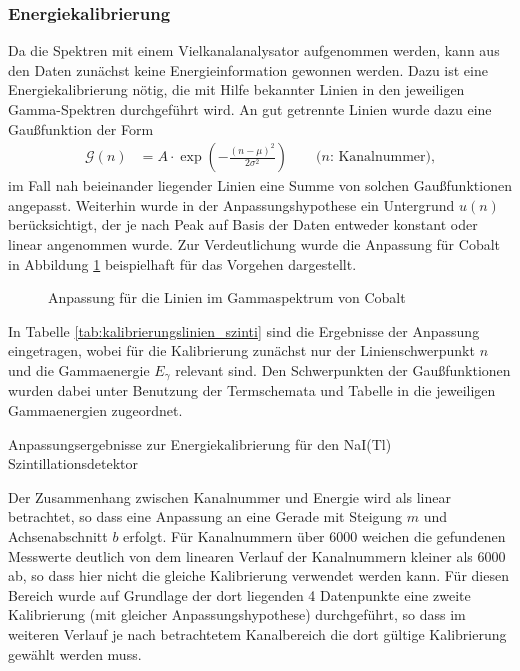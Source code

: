 \documentclass[11pt, a4paper]{article}
\numberwithin{equation}{section}
\begin{document}
\subsubsection{Energiekalibrierung}
\label{sec:kalibrierung_szinti}
Da die Spektren mit einem Vielkanalanalysator aufgenommen werden, kann aus den Daten zunächst keine Energieinformation gewonnen werden.
Dazu ist eine Energiekalibrierung nötig, die mit Hilfe bekannter Linien in den jeweiligen Gamma-Spektren durchgeführt wird.
An gut getrennte Linien wurde dazu eine Gaußfunktion der Form
\begin{align}
\mathcal{G}(n) &= A \cdot \exp\left( - \frac{(n - \mu)^2}{2 \sigma^2}\right) \qquad\text{($n$: Kanalnummer),}
\label{eq:gaussfithypothese}
\end{align}
im Fall nah beieinander liegender Linien eine Summe von solchen Gaußfunktionen angepasst.
Weiterhin wurde in der Anpassungshypothese ein Untergrund $u(n)$ berücksichtigt, der je nach Peak auf Basis der Daten entweder konstant oder linear angenommen wurde.
Zur Verdeutlichung wurde die Anpassung für Cobalt in Abbildung \ref{fig:fit_cobalt} beispielhaft für das Vorgehen dargestellt.
\begin{figure}[ht]
	\centering
	\resizebox{0.85\textwidth}{!}{
	
	}
	\caption{Anpassung für die Linien im Gammaspektrum von Cobalt}
	\label{fig:fit_cobalt}
\end{figure}
In Tabelle \ref{tab:kalibrierungslinien_szinti} sind die Ergebnisse der Anpassung eingetragen, wobei für die Kalibrierung zunächst nur der Linienschwerpunkt $n$ und die Gammaenergie $E_\gamma$ relevant sind.
Den Schwerpunkten der Gaußfunktionen wurden dabei unter Benutzung der Termschemata und Tabelle in \cite{anleitung} die jeweiligen Gammaenergien zugeordnet.
\begin{table}[ht]
	\centering
	
	\caption{Anpassungsergebnisse zur Energiekalibrierung für den NaI(Tl) Szintillationsdetektor}
	\label{tab:kalibrierungslinien_szinti}
\end{table}
Der Zusammenhang zwischen Kanalnummer und Energie wird als linear betrachtet, so dass eine Anpassung an eine Gerade mit Steigung $m$ und Achsenabschnitt $b$ erfolgt.
Für Kanalnummern über \num{6000} weichen die gefundenen Messwerte deutlich von dem linearen Verlauf der Kanalnummern kleiner als \num{6000} ab, so dass hier nicht die gleiche Kalibrierung verwendet werden kann.
Für diesen Bereich wurde auf Grundlage der dort liegenden \num{4} Datenpunkte eine zweite Kalibrierung (mit gleicher Anpassungshypothese) durchgeführt, so dass im weiteren Verlauf je nach betrachtetem Kanalbereich die dort gültige Kalibrierung gewählt werden muss. 
\end{document}
